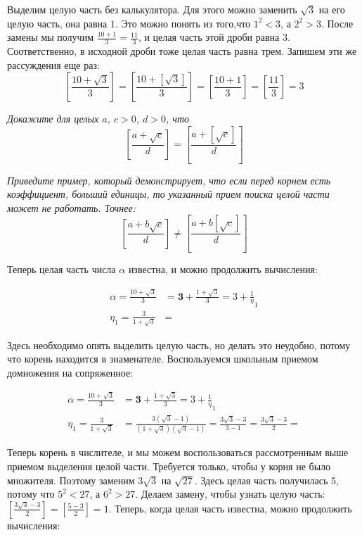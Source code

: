 \documentclass{article}
\newenvironment{exercise}{%
\begin{framed}\par\noindent\slshape%
}%
{\end{framed}}
\begin{document}
Выделим целую часть без калькулятора. Для этого можно заменить $\sqrt3$ на его целую часть, она равна $1$. Это можно понять из того,что $1^2<3$, а $2^2>3$. После замены мы получим $\frac{10 + 1}{3}=\frac{11}3$, и целая часть этой дроби равна $3$. Соответственно, в исходной дроби тоже целая часть равна трем. Запишем эти же рассуждения еще раз:
$$\left[\frac{10+\sqrt3}{3}\right]=\left[\frac{10+[\sqrt3]}{3}\right]=\left[\frac{10+1}{3}\right]=
\left[\frac{11}{3}\right]=3$$

\begin{exercise}%
Докажите для целых $a$, $c>0$, $d>0$, что
$$
\left[\frac{a + \sqrt{c}}{d}\right]=
\left[\frac{a + [\sqrt{c}]}{d}\right]
$$
\end{exercise}

\begin{exercise}%
Приведите пример, который демонстрирует, что если перед корнем есть коэффициент, больший единицы, то указанный прием поиска целой части может не работать. Точнее:
$$
\left[\frac{a + b\sqrt{c}}{d}\right]\neq
\left[\frac{a + b[\sqrt{c}]}{d}\right]
$$
\end{exercise}

Теперь целая часть числа $\alpha$ известна, и можно продолжить вычисления:

\begin{align*}
\alpha=\frac{10+\sqrt3}{3}&=\mathbf3 + \frac{1+\sqrt3}{3}=3+\frac1\eta_1\\
\eta_1=\frac3{1+\sqrt3}&=
\end{align*}

Здесь необходимо опять выделить целую часть, но делать это неудобно, потому что корень находится в знаменателе.
Воспользуемся школьным приемом домножения на сопряженное:

\begin{align*}
\alpha=\frac{10+\sqrt3}{3}&=\mathbf3 + \frac{1+\sqrt3}{3}=3+\frac1\eta_1\\
\eta_1=\frac3{1+\sqrt3}&=\frac{3(\sqrt3-1)}{(1+\sqrt3)(\sqrt3-1)}=
\frac{3\sqrt3-3}{3-1}=\frac{3\sqrt3-3}{2}=
\end{align*}

Теперь корень в числителе, и мы можем воспользоваться рассмотренным выше приемом выделения целой части. Требуется только, чтобы у корня не было множителя. Поэтому заменим $3\sqrt3$ на $\sqrt{27}$. Здесь целая часть получилась 5, потому что $5^2<27$, а $6^2>27$.
Делаем замену, чтобы узнать целую часть: $\left[\frac{3\sqrt3-3}{2}\right]=\left[\frac{5-3}2\right]=1$. Теперь, когда целая часть известна, можно продолжить вычисления:
\end{document}
